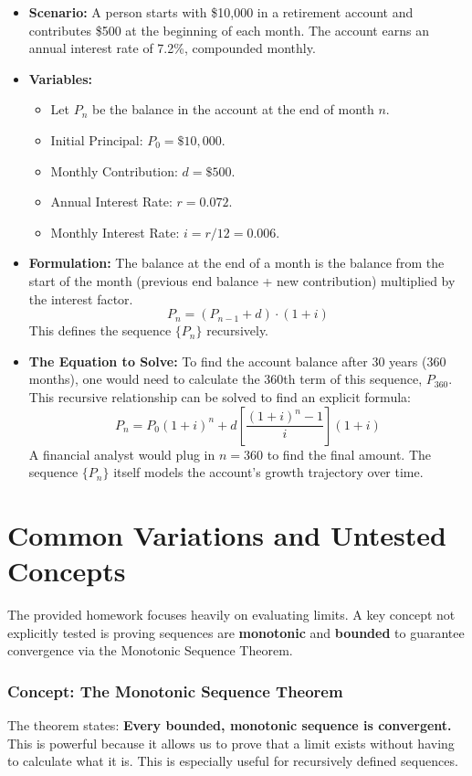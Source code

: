 \documentclass{article}
\begin{document}
\begin{itemize}
    \item \textbf{Scenario:} A person starts with \$10,000 in a retirement account and contributes \$500 at the beginning of each month. The account earns an annual interest rate of 7.2\%, compounded monthly.
    \item \textbf{Variables:}
        \begin{itemize}
            \item Let $P_n$ be the balance in the account at the end of month $n$.
            \item Initial Principal: $P_0 = \$10,000$.
            \item Monthly Contribution: $d = \$500$.
            \item Annual Interest Rate: $r = 0.072$.
            \item Monthly Interest Rate: $i = r/12 = 0.006$.
        \end{itemize}
    \item \textbf{Formulation:} The balance at the end of a month is the balance from the start of the month (previous end balance + new contribution) multiplied by the interest factor.
    \[ P_{n} = (P_{n-1} + d) \cdot (1+i) \]
    This defines the sequence $\{P_n\}$ recursively.
    \item \textbf{The Equation to Solve:} To find the account balance after 30 years (360 months), one would need to calculate the 360th term of this sequence, $P_{360}$. This recursive relationship can be solved to find an explicit formula:
    \[ P_n = P_0(1+i)^n + d \left[ \frac{(1+i)^n - 1}{i} \right] (1+i) \]
    A financial analyst would plug in $n=360$ to find the final amount. The sequence $\{P_n\}$ itself models the account's growth trajectory over time.
\end{itemize}

\section{Common Variations and Untested Concepts}
The provided homework focuses heavily on evaluating limits. A key concept not explicitly tested is proving sequences are \textbf{monotonic} and \textbf{bounded} to guarantee convergence via the Monotonic Sequence Theorem.

\subsubsection{Concept: The Monotonic Sequence Theorem}
The theorem states: \textbf{Every bounded, monotonic sequence is convergent.}
This is powerful because it allows us to prove that a limit exists without having to calculate what it is. This is especially useful for recursively defined sequences.
\end{document}
